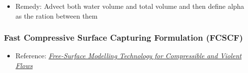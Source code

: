 \begin{itemize}
    \item Remedy: Advect both water volume and total volume and then define alpha as the ration between them
\end{itemize}

\subsubsection{Fast Compressive Surface Capturing Formulation (FCSCF)}

\begin{itemize}
    \item Reference: \textit{\href{http://researchspace.csir.co.za/dspace/bitstream/10204/5282/1/Heyns_2011.pdf}{Free-Surface Modelling Technology for Compressible and Violent Flows}}
\end{itemize}